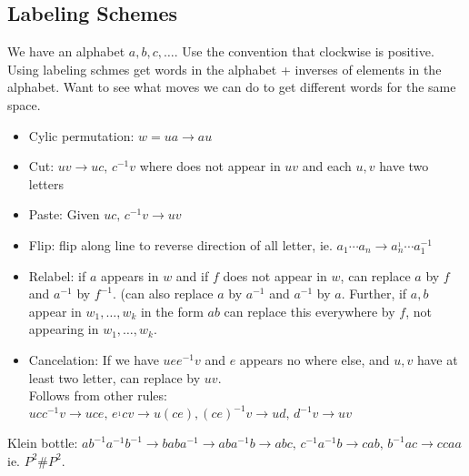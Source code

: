 
\subsection{Labeling Schemes}

We have an alphabet $a, b, c, \ldots$. Use the convention that clockwise is positive. Using labeling schmes get words in the alphabet + inverses of elements in the alphabet. Want to see what moves we can do to get different words for the same space. 
\begin{itemize}
    \item Cylic permutation: $w = ua \to au$ 
    \item Cut: $uv \to uc, \, c^{-1}v$ where does not appear in $uv$ and each $u,v$ have two letters 
    \item Paste: Given $uc, \, c^{-1}v \to uv$
    \item Flip: flip along line to reverse direction of all letter, ie. $a_1 \cdots a_n \to a_n^{_1} \cdots a_1^{-1}$
    \item Relabel: if $a$ appears in $w$ and if $f$ does not appear in $w$, can replace $a$ by $f$ and $a^{-1}$ by $f^{-1}$. (can also replace $a$ by $a^{-1}$ and $a^{-1}$ by $a$. Further, if $a,b$ appear in $w_1, \ldots, w_k$ in the form $ab$ can replace this everywhere by $f$, not appearing in $w_1, \ldots, w_k$. 
    \item Cancelation: If we have $uee^{-1}v$ and $e$ appears no where else, and $u,v$ have at least two letter, can replace by $uv$. \\
    Follows from other rules: $ucc^{-1}v \to uce, \, e^{_1}cv \to u(ce), (ce)^{-1}v \to ud, \, d^{-1}v \to uv$ 
\end{itemize}

\begin{example}
    Klein bottle: $ab^{-1}a^{-1}b^{-1} \to baba^{-1} \to aba^{-1}b \to abc, \, c^{-1}a^{-1}b \to cab, \, b^{-1}ac \to ccaa$ ie. $P^2 \# P^2$. 
\end{example}